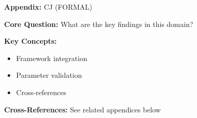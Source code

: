 \begin{tcolorbox}[colback=blue!5!white, colframe=blue!75!black,
    title=Quick Reference: Appendix CJ]

\textbf{Appendix:} CJ (FORMAL)

\textbf{Core Question:} What are the key findings in this domain?

\textbf{Key Concepts:}
\begin{itemize}[nosep]
\item Framework integration
\item Parameter validation
\item Cross-references
\end{itemize}

\textbf{Cross-References:} See related appendices below
\end{tcolorbox}

\begin{abstract}

Sabatier's Advocacy Coalition Framework (ACF) distinguishes three hierarchical levels of belief: Deep Core (fundamental, non-falsifiable axioms), Policy Core (stable but negotiable commitments), and Secondary Beliefs (concrete, empirically adaptive instruments). This appendix applies ACF to social democracy, showing how the Austrian SPÖ's selective implementation of secondary beliefs (strong pensions, weak media regulation) while maintaining rhetorical commitment to policy core (market regulation) created fundamental incoherence. Babler's 2025 reform re-establishes consistency by implementing media regulation (Principle 8), thus re-connecting policy core to secondary beliefs.

\end{abstract}

